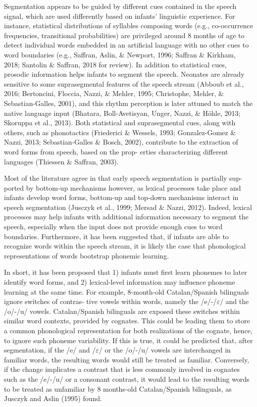 \documentclass[man,floatsintext]{apa6}
\begin{document}
Segmentation appears to be guided by different cues contained in the speech signal, which are used differently based on infants' linguistic experience. For instance, statistical distributions of syllables composing words (e.g., co-occurrence frequencies, transitional probabilities) are privileged around 8 months of age to detect individual words embedded in an artificial language with no other cues to word boundaries (e.g., Saffran, Aslin, \& Newport, 1996; Saffran \& Kirkham, 2018; Santolin \& Saffran, 2018 for review). In addition to statistical cues, prosodic information helps infants to segment the speech. Neonates are already sensitive to some suprasegmental features of the speech stream (Abboub et al., 2016; Bertoncini, Floccia, Nazzi, \& Mehler, 1995; Christophe, Mehler, \& Sebastian-Galles, 2001), and this rhythm perception is later attuned to match the native language input (Bhatara, Boll-Avetisyan, Unger, Nazzi, \& Höhle, 2013; Skoruppa et al., 2013). Both statistical and suprasegmental cues, along with others, such as phonotactics (Friederici \& Wessels, 1993; Gonzalez-Gomez \& Nazzi, 2013; Sebastian-Galles \& Bosch, 2002), contribute to the extraction of word forms from speech, based on the prop- erties characterizing different languages (Thiessen \& Saffran, 2003).

Most of the literature agree in that early speech segmentation is partially sup- ported by bottom-up mechanisms however, as lexical processes take place and infants develop word forms, bottom-up and top-down mechanisms interact in speech segmentation (Jusczyk et al., 1999; Mersad \& Nazzi, 2012). Indeed, lexical processes may help infants with additional information necessary to segment the speech, especially when the input does not provide enough cues to word boundaries. Furthermore, it has been suggested that, if infants are able to recognize words within the speech stream, it is likely the case that phonological representations of words bootstrap phonemic learning.

In short, it has been proposed that 1) infants must first learn phonemes to later identify word forms, and 2) lexical-level information may influence phoneme learning at the same time. For example, 8-month-old Catalan/Spanish bilinguals ignore switches of contras- tive vowels within words, namely the /e/-/\(\varepsilon\)/ and the /o/-/u/ vowels. Catalan/Spanish bilinguals are exposed these switches within similar word contexts, provided by cognates. This could be leading them to store a common phonological representation for both realizations of the cognate, hence, to ignore such phoneme variability. If this is true, it could be predicted that, after segmentation, if the /e/ and /\(\varepsilon\)/ or the /o/-/u/ vowels are interchanged in familiar words, the resulting words would still be treated as familiar. Conversely, if the change implicates a contrast that is less commonly involved in cognates such as the /e/-/u/ or a consonant contrast, it would lead to the resulting words to be treated as unfamiliar by 8 months-old Catalan/Spanish bilinguals, as Jusczyk and Aslin (1995) found.
\end{document}
